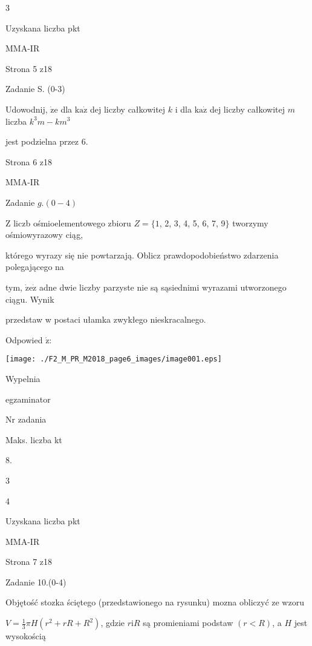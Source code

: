 \documentclass[a4paper,12pt]{article}
\begin{document}
3

Uzyskana liczba pkt

MMA-IR

Strona 5 z18





Zadanie S. (0-3)

Udowodnij, $\dot{\mathrm{z}}\mathrm{e}$ dla $\mathrm{k}\mathrm{a}\dot{\mathrm{z}}$ dej liczby całkowitej $k$ i dla $\mathrm{k}\mathrm{a}\dot{\mathrm{z}}$ dej liczby całkowitej $m$ liczba $k^{3}m-km^{3}$

jest podzielna przez 6.

Strona 6 z18

MMA-IR





Zadanie $g. (0-4)$

$\mathrm{Z}$ liczb ośmioelementowego zbioru $Z=\{1$, 2, 3, 4, 5, 6, 7, 9$\}$ tworzymy ośmiowyrazowy ciąg,

którego wyrazy się nie powtarzają. Oblicz prawdopodobieństwo zdarzenia polegającego na

tym, $\dot{\mathrm{z}}\mathrm{e}\dot{\mathrm{z}}$ adne dwie liczby parzyste nie są sąsiednimi wyrazami utworzonego ciągu. Wynik

przedstaw w postaci ułamka zwykłego nieskracalnego.

Odpowied $\acute{\mathrm{z}}$:
\begin{center}
\texttt{[image: ./F2\_M\_PR\_M2018\_page6\_images/image001.eps]}
\end{center}
Wypelnia

egzaminator

Nr zadania

Maks. liczba kt

8.

3

4

Uzyskana liczba pkt

MMA-IR

Strona 7 z18





Zadanie 10.(0-4)

Objętość stozka ściętego (przedstawionego na rysunku) mozna obliczyć ze wzoru

$V=\displaystyle \frac{1}{3}\pi H(r^{2}+rR+R^{2})$, gdzie $r\mathrm{i}R$ są promieniami podstaw $(r<R)$, a $H$ jest wysokością
\end{document}
